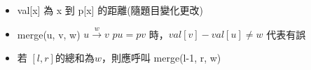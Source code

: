 \begin{itemize}[leftmargin=2em, listparindent=-2em]
    \item val[x] 為 x 到 p[x] 的距離(隨題目變化更改)
    \item merge(u, v, w)
        \subitem $u \stackrel{w}{\longrightarrow} v$
        \subitem $pu=pv$ 時，$val[v]-val[u] \ne w$ 代表有誤
    \item 若 $[l, r]$的總和為$w$，則應呼叫 merge(l-1, r, w)
\end{itemize}